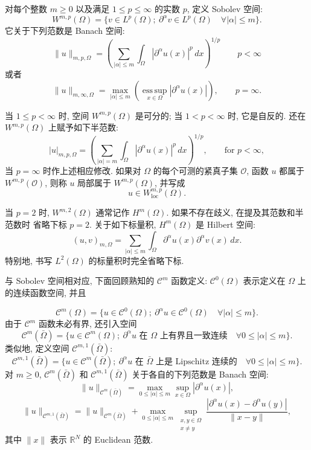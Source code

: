对每个整数 $m\geq0$ 以及满足 $1\leq p\leq\infty$ 的实数 $p$, 定义 Sobolev 空间:
\[
  W^{m,p}(\Omega)=\{v\in L^p(\Omega);\ \partial^\alpha v\in L^p(\Omega)
  \quad\forall|\alpha|\leq m\}.
\]
它关于下列范数是 Banach 空间:
\begin{equation}\label{eq:sobolev-norm-mp}
  \|u\|_{m,p,\Omega}=
  \left(\sum_{|\alpha|\leq m}\int_\Omega|\partial^\alpha u(x)|^p\,dx\right)^{1/p}
  \qquad p<\infty
\end{equation}
或者
\[
  \|u\|_{m,\infty,\Omega}=
  \max_{|\alpha|\leq m}
  \left(\operatorname*{ess\,sup}_{x\in\Omega}|\partial^\alpha u(x)|\right),
  \qquad p=\infty.
\]

当 $1\leq p<\infty$ 时, 空间 $W^{m,p}(\Omega)$ 是可分的; 当 $1<p<\infty$ 时, 它是自反的.
还在 $W^{m,p}(\Omega)$ 上赋予如下半范数:
\begin{equation}\label{eq:sobolev-seminorm-mp}
  |u|_{m,p,\Omega}=
  \left(\sum_{|\alpha|=m}\int_\Omega|\partial^\alpha u(x)|^p\,dx\right)^{1/p},
  \qquad\text{for }p<\infty,
\end{equation}
当 $p=\infty$ 时作上述相应修改. 如果对 $\Omega$ 的每个可测的紧真子集 $\mathcal O$,
函数 $u$ 都属于 $W^{m,p}(\mathcal O)$, 则称 $u$ 局部属于 $W^{m,p}(\Omega)$, 并写成
\[
  u\in W^{m,p}_{\mathrm{loc}}(\Omega).
\]

当 $p=2$ 时, $W^{m,2}(\Omega)$ 通常记作 $H^m(\Omega)$. 如果不存在歧义, 在提及其范数和半范数时
省略下标 $p=2$. 关于如下标量积, $H^m(\Omega)$ 是 Hilbert 空间:
\begin{equation}\label{eq:sobolev-hm-inner-product}
  (u,v)_{m,\Omega}=\sum_{|\alpha|\leq m}
  \int_\Omega\partial^\alpha u(x)\partial^\alpha v(x)\,dx.
\end{equation}
特别地, 书写 $L^2(\Omega)$ 的标量积时完全省略下标.

与 Sobolev 空间相对应, 下面回顾熟知的 $\mathcal C^m$ 函数定义:
$\mathcal C^0(\Omega)$ 表示定义在 $\Omega$ 上的连续函数空间, 并且

\[
  \mathcal C^m(\Omega)=\{u\in\mathcal C^0(\Omega);\
  \partial^\alpha u\in\mathcal C^0(\Omega)\quad\forall|\alpha|\leq m\}.
\]
由于 $\mathcal C^m$ 函数未必有界, 还引入空间
\[
  \mathcal C^m(\bar\Omega)=\{u\in\mathcal C^m(\Omega);\
  \partial^\alpha u\text{ 在 }\Omega\text{ 上有界且一致连续}
  \quad\forall0\leq|\alpha|\leq m\}.
\]
类似地, 定义空间 $\mathcal C^{m,1}(\bar\Omega)$:
\[
  \mathcal C^{m,1}(\bar\Omega)=\{u\in\mathcal C^m(\bar\Omega);\
  \partial^\alpha u\text{ 在 }\bar\Omega\text{ 上是 Lipschitz 连续的}
  \quad\forall0\leq|\alpha|\leq m\}.
\]
对 $m\geq0$, $\mathcal C^m(\bar\Omega)$ 和 $\mathcal C^{m,1}(\bar\Omega)$ 关于各自的下列范数是 Banach 空间:
\[
  \|u\|_{\mathcal C^m(\bar\Omega)}=
  \max_{0\leq|\alpha|\leq m}\sup_{x\in\Omega}|\partial^\alpha u(x)|,
\]
\[
  \|u\|_{\mathcal C^{m,1}(\bar\Omega)}=
  \|u\|_{\mathcal C^m(\bar\Omega)}+
  \max_{0\leq|\alpha|\leq m}\sup_{\substack{x,y\in\Omega\\x\neq y}}
  \frac{|\partial^\alpha u(x)-\partial^\alpha u(y)|}{\|x-y\|},
\]
其中 $\|x\|$ 表示 $\mathbb R^N$ 的 Euclidean 范数.

